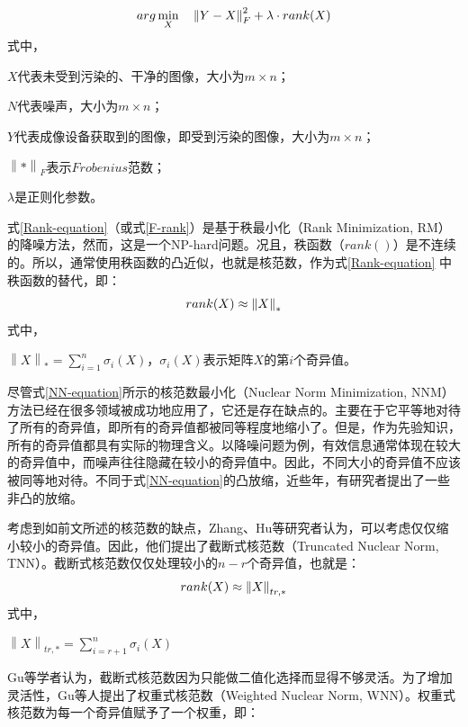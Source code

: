 \documentclass[12pt, a4paper]{article}
\begin{document}
\begin{equation}
\centering
arg\min\limits_{X} \quad \left\|Y-X\right\|_F^2 + \lambda \cdot rank(X)
\label{F-rank}
\end{equation}
式中，
\par$X$代表未受到污染的、干净的图像，大小为$m \times n$；
\par$N$代表噪声，大小为$m \times n$；
\par$Y$代表成像设备获取到的图像，即受到污染的图像，大小为$m \times n$；
\par$\left\|*\right\|_F$表示$Frobenius$范数；
\par$\lambda$是正则化参数。
\par 式\ref{Rank-equation}（或式\ref{F-rank}）是基于秩最小化（Rank Minimization, RM）的降噪方法，然而，这是一个NP-hard问题\cite{TNN-1}。况且，秩函数（$rank()$）是不连续的\cite{TNN-1}。所以，通常使用秩函数的凸近似，也就是核范数，作为式\ref{Rank-equation} 中秩函数的替代\cite{TNN-1}，即：
\begin{equation}
\centering
rank(X) \approx \left\|X\right\|_*
\label{NN-equation}
\end{equation}
式中，
\par $\left\|X\right\|_* = \sum\limits_{i=1}^{n}\sigma_i(X)$，$\sigma_i(X)$表示矩阵$X$的第$i$个奇异值。
\par 尽管式\ref{NN-equation}所示的核范数最小化（Nuclear Norm Minimization, NNM）方法已经在很多领域被成功地应用了，它还是存在缺点的。主要在于它平等地对待了所有的奇异值，即所有的奇异值都被同等程度地缩小了\cite{Review}。但是，作为先验知识，所有的奇异值都具有实际的物理含义。以降噪问题为例，有效信息通常体现在较大的奇异值中，而噪声往往隐藏在较小的奇异值中。因此，不同大小的奇异值不应该被同等地对待\cite{WNN-1}。不同于式\ref{NN-equation}的凸放缩，近些年，有研究者提出了一些非凸的放缩。
\par 考虑到如前文所述的核范数的缺点，Zhang、Hu等研究者认为，可以考虑仅仅缩小较小的奇异值\cite{TNN-1}。因此，他们提出了截断式核范数（Truncated Nuclear Norm, TNN）。截断式核范数仅仅处理较小的$n-r$个奇异值，也就是：
\begin{equation}
\centering
rank(X) \approx \left\|X\right\|_{tr,*}
\label{TNN-equation}
\end{equation}
式中，
\par $\left\|X\right\|_{tr,*} = \sum\limits_{i=r+1}^{n}\sigma_i(X)$
\par Gu等学者认为，截断式核范数因为只能做二值化选择而显得不够灵活\cite{WNN-1}。为了增加灵活性，Gu等人提出了权重式核范数（Weighted Nuclear Norm, WNN）。权重式核范数为每一个奇异值赋予了一个权重，即：
\end{document}
